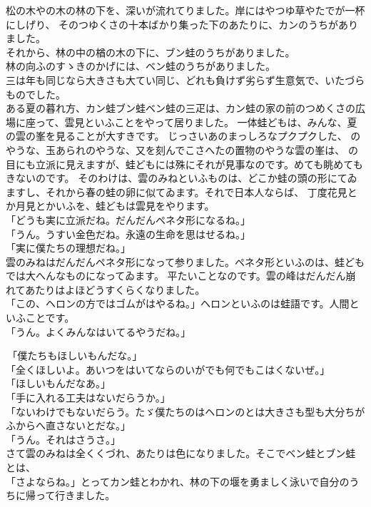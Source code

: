 \documentclass[
a4paper,
10pt,
book]
{tarticle}
\begin{document}
\indent 松の木やの木の林の下を、深いが流れてりました。岸にはやつゆ草やたでが一杯にしげり、
そのつゆくさの十本ばかり集った下のあたりに、カンのうちがありました。\\
\indent それから、林の中の楢の木の下に、ブン蛙のうちがありました。\\
\indent 林の向ふのすゝきのかげには、ベン蛙のうちがありました。\\
\indent 三は年も同じなら大きさも大てい同じ、どれも負けず劣らず生意気で、いたづらものでした。\\
\indent ある夏の暮れ方、カン蛙ブン蛙ベン蛙の三疋は、カン蛙の家の前のつめくさの広場に座って、雲見といふことをやって居りました。
一体蛙どもは、みんな、夏の雲の峯を見ることが大すきです。
じっさいあのまっしろなプクプクした、
のやうな、玉あられのやうな、又を刻んでこさへたの置物のやうな雲の峯は、
の目にも立派に見えますが、蛙どもには殊にそれが見事なのです。めても眺めてもきないのです。
そのわけは、雲のみねといふものは、どこか蛙の頭の形にてゐますし、それから春の蛙の卵に似てゐます。それで日本人ならば、
丁度花見とか月見とかいふを、蛙どもは雲見をやります。\\
「どうも実に立派だね。だんだんペネタ形になるね。」\\
「うん。うすい金色だね。永遠の生命を思はせるね。」\\
「実に僕たちの理想だね。」\\
\indent 雲のみねはだんだんペネタ形になって参りました。ペネタ形といふのは、蛙どもでは大へんなものになってゐます。
平たいことなのです。雲の峰はだんだん崩れてあたりはよほどうすくらくなりました。\\
「この、ヘロンの方ではゴムがはやるね。」ヘロンといふのは蛙語です。人間といふことです。\\
「うん。よくみんなはいてるやうだね。」

\newpage
\setcounter{page}{3}
\thispagestyle{fancy}

\noindent \,「僕たちもほしいもんだな。」\\
「全くほしいよ。あいつをはいてならのいがでも何でもこはくないぜ。」\\
「ほしいもんだなあ。」\\
「手に入れる工夫はないだらうか。」\\
「ないわけでもないだらう。たゞ僕たちのはヘロンのとは大きさも型も大分ちがふからへ直さないとだな。」\\
「うん。それはさうさ。」\\
\indent さて雲のみねは全くくづれ、あたりは色になりました。そこでベン蛙とブン蛙とは、\\
「さよならね。」とってカン蛙とわかれ、林の下の堰を勇ましく泳いで自分のうちに帰って行きました。
\end{document}
